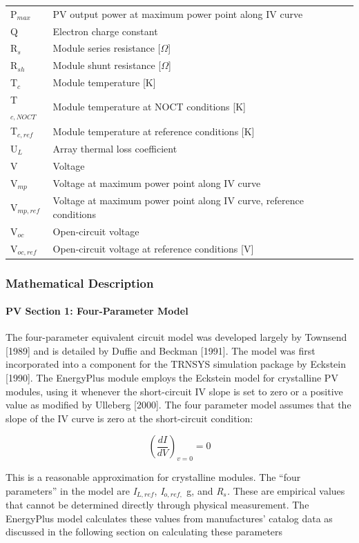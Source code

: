 \begin{longtable}[l]{p{1.2in}p{4.8in}}
P\(_{max}\) & PV output power at maximum power point along IV curve \tabularnewline
Q & Electron charge constant \tabularnewline
R\(_{s}\) & Module series resistance [$\Omega$] \tabularnewline
R\(_{sh}\) & Module shunt resistance [$\Omega$] \tabularnewline
T\(_{c}\)­ & Module temperature [K] \tabularnewline
T\(_{c,NOCT}\) & Module temperature at NOCT conditions [K] \tabularnewline
T\(_{c,ref}\) & Module temperature at reference conditions [K] \tabularnewline
U\(_{L}\) & Array thermal loss coefficient \tabularnewline
V & Voltage \tabularnewline
V\(_{mp}\) & Voltage at maximum power point along IV curve \tabularnewline
V\(_{mp,ref}\) & Voltage at maximum power point along IV curve, reference conditions \tabularnewline
V\(_{oc}\)­ & Open-circuit voltage \tabularnewline
V\(_{oc,ref}\) & Open-circuit voltage at reference conditions [V] \tabularnewline
\bottomrule
\end{longtable}

\subsubsection{Mathematical Description}\label{mathematical-description-1}

\paragraph{PV Section 1: Four-Parameter Model}\label{pv-section-1-four-parameter-model}

The four-parameter equivalent circuit model was developed largely by Townsend {[}1989{]} and is detailed by Duffie and Beckman {[}1991{]}. The model was first incorporated into a component for the TRNSYS simulation package by Eckstein {[}1990{]}. The EnergyPlus module employs the Eckstein model for crystalline PV modules, using it whenever the short-circuit IV slope is set to zero or a positive value as modified by Ulleberg {[}2000{]}. The four parameter model assumes that the slope of the IV curve is zero at the short-circuit condition:

\begin{equation}
{\left( {\frac{{dI}}{{dV}}} \right)_{v = 0}} = 0
\end{equation}

This is a reasonable approximation for crystalline modules. The ``four parameters'' in the model are \emph{I\(_{L,ref}\)}, \emph{I\(_{o,ref,}\)} g, and \emph{R\(_{s}\).} These are empirical values that cannot be determined directly through physical measurement. The EnergyPlus model calculates these values from manufactures' catalog data as discussed in the following section on calculating these parameters

